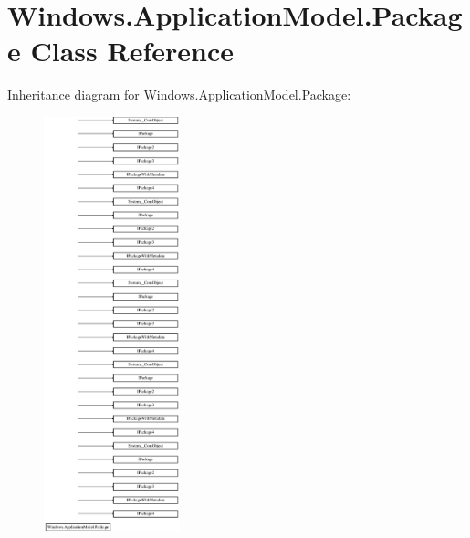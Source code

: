 \hypertarget{class_windows_1_1_application_model_1_1_package}{}\section{Windows.\+Application\+Model.\+Package Class Reference}
\label{class_windows_1_1_application_model_1_1_package}
Inheritance diagram for Windows.\+Application\+Model.\+Package\+:\begin{figure}[H]
\begin{center}
\leavevmode
\includegraphics[height=12.000000cm]{class_windows_1_1_application_model_1_1_package}
\end{center}
\end{figure}
